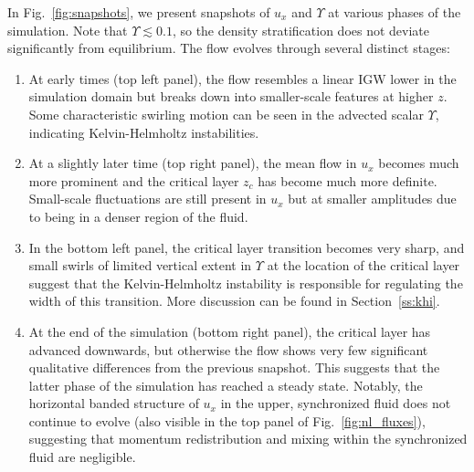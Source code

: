 \documentclass[
        fleqn,
        usenatbib,
    ]{mnras}
\begin{document}
In Fig.~\ref{fig:snapshots}, we present snapshots of $u_x$ and $\Upsilon$ at
various phases of the simulation. \textcolor{Corr}{Note that $\Upsilon \lesssim
0.1$, so the density stratification does not deviate significantly from
equilibrium.} The flow evolves through several distinct stages:
\begin{enumerate}
    \item At early times (top left panel), the flow resembles a linear IGW lower
        in the simulation domain but breaks down into smaller-scale features at
        higher $z$. Some characteristic swirling motion can be seen in the
        advected scalar $\Upsilon$, indicating Kelvin-Helmholtz instabilities.

    \item At a slightly later time (top right panel), the mean flow in
        $u_x$ becomes much more prominent and the critical layer $z_c$ has
        become much more definite. Small-scale fluctuations are still present in
        $u_x$ but at smaller amplitudes due to being in a denser region of the
        fluid.

    \item In the bottom left panel, the critical layer transition becomes very
        sharp, and small swirls of limited vertical extent in $\Upsilon$ at the
        location of the critical layer suggest that the Kelvin-Helmholtz
        instability is responsible for regulating the width of this transition.
        More discussion can be found in Section~\ref{ss:khi}.

    \item At the end of the simulation (bottom right panel), the
        \textcolor{Corr}{critical layer has advanced downwards, but otherwise}
        the flow shows very few significant qualitative differences from the
        previous snapshot. This suggests that the latter phase of the simulation
        has reached a steady state. \textcolor{Corr}{Notably, the horizontal
        banded structure of $u_x$ in the upper, synchronized fluid does not
        continue to evolve (also visible in the top panel of
        Fig.~\ref{fig:nl_fluxes}), suggesting that momentum redistribution and
        mixing within the synchronized fluid are negligible.}
\end{enumerate}
\end{document}
